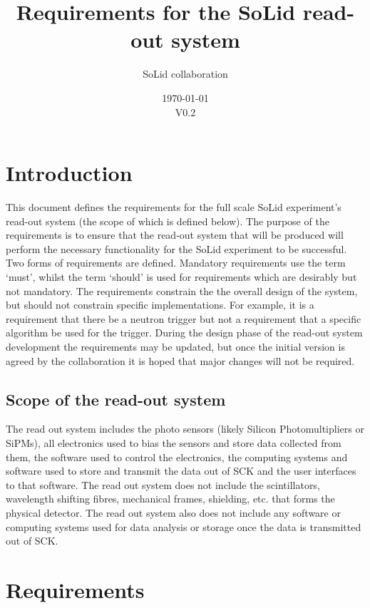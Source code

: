\documentclass[a4paper]{article}
\title{Requirements for the SoLid read-out system}
\author[]{SoLid collaboration}
\date{\today\\V0.2}
\begin{document}
\maketitle

\tableofcontents

\section{Introduction}

This document defines the requirements for the full scale SoLid experiment's read-out system (the scope of which is defined below).
The purpose of the requirements is to ensure that the read-out system that will be produced will perform the necessary functionality for the SoLid experiment to be successful.
Two forms of requirements are defined.
Mandatory requirements use the term `must', whilst the term `should' is used for requirements which are desirably but not mandatory.
The requirements constrain the the overall design of the system, but should not constrain specific implementations.
For example, it is a requirement that there be a neutron trigger but not a requirement that a specific algorithm be used for the trigger.
During the design phase of the read-out system development the requirements may be updated, but once the initial version is agreed by the collaboration it is hoped that major changes will not be required.

\subsection{Scope of the read-out system}

The read out system includes the photo sensors (likely Silicon Photomultipliers or SiPMs), all electronics used to bias the sensors and store data collected from them, the software used to control the electronics,  the computing systems and software used to store and transmit the data out of SCK and the user interfaces to that software. 
The read out system does not include the scintillators, wavelength shifting fibres, mechanical frames, shielding, etc. that forms the physical detector. 
The read out system also does not include any software or computing systems used for data analysis or storage once the data is transmitted out of SCK.

\section{Requirements}
\end{document}
